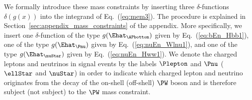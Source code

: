 We formally introduce these mass constraints by inserting three $\delta$-functions $\delta\left( g(x) \right)$ into the integrand of Eq.~(\ref{eq:mem3}).
The procedure is explained in Section~\ref{sec:appendix_mass_constraints} of the appendix.
More specifically, we insert
one $\delta$-function of the type $g(\Ehat_{\APbottom})$ given by Eq.~(\ref{eq:bEn_Hbb1}), 
one of the type $g(\Ehat_{\Pnu})$ given by Eq.~(\ref{eq:nuEn_Wlnu1}), and one of the type $g(\Ehat_{\nuStar})$ given by Eq.~(\ref{eq:nuEn_Hww1}).
We denote the charged leptons and neutrinos in signal events by the labels $\Plepton$ and $\Pnu$ ($\ellStar$ and $\nuStar$)
in order to indicate which charged lepton and neutrino originates from the decay of the on-shell (off-shell) $\PW$ boson and is therefore subject (not subject) to the $\PW$ mass constraint.

